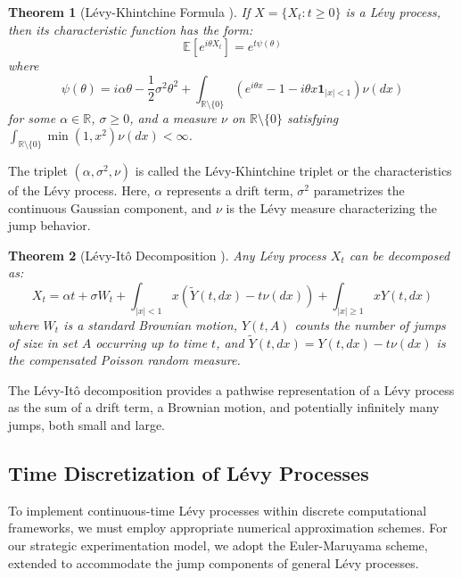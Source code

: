 \documentclass[a4paper,12pt]{report}
\newtheorem{theorem}{Theorem}
\begin{document}
\begin{theorem}[Lévy-Khintchine Formula \cite{sato1999levy, applebaum2009levy}]
    If $X = \{X_t : t \geq 0\}$ is a Lévy process, then its characteristic function has the form:
    \begin{equation}
        \mathbb{E}[e^{i\theta X_t}] = e^{t\psi(\theta)}
    \end{equation}
    where
    \begin{equation}
        \psi(\theta) = i\alpha\theta - \frac{1}{2}\sigma^2\theta^2 + \int_{\mathbb{R}\setminus\{0\}} (e^{i\theta x} - 1 - i\theta x\mathbf{1}_{|x|<1})\nu(dx)
    \end{equation}
    for some $\alpha \in \mathbb{R}$, $\sigma \geq 0$, and a measure $\nu$ on $\mathbb{R}\setminus\{0\}$ satisfying $\int_{\mathbb{R}\setminus\{0\}} \min(1, x^2)\nu(dx) < \infty$.
\end{theorem}

The triplet $(\alpha, \sigma^2, \nu)$ is called the Lévy-Khintchine triplet or the characteristics of the Lévy process. Here, $\alpha$ represents a drift term, $\sigma^2$ parametrizes the continuous Gaussian component, and $\nu$ is the Lévy measure characterizing the jump behavior.

\begin{theorem}[Lévy-Itô Decomposition \cite{sato1999levy, protter2005stochastic}]
    Any Lévy process $X_t$ can be decomposed as:
    \begin{equation}
        X_t = \alpha t + \sigma W_t + \int_{|x|<1} x (\tilde{Y}(t, dx) - t\nu(dx)) + \int_{|x|\geq 1} x Y(t, dx)
    \end{equation}
    where $W_t$ is a standard Brownian motion, $Y(t, A)$ counts the number of jumps of size in set $A$ occurring up to time $t$, and $\tilde{Y}(t, dx) = Y(t, dx) - t\nu(dx)$ is the compensated Poisson random measure.
\end{theorem}

The Lévy-Itô decomposition provides a pathwise representation of a Lévy process as the sum of a drift term, a Brownian motion, and potentially infinitely many jumps, both small and large.

\subsection{Time Discretization of Lévy Processes}
\label{appendix:levy_discretization_methods}

To implement continuous-time Lévy processes within discrete computational frameworks, we must employ appropriate numerical approximation schemes. For our strategic experimentation model, we adopt the Euler-Maruyama scheme, extended to accommodate the jump components of general Lévy processes.
\end{document}
